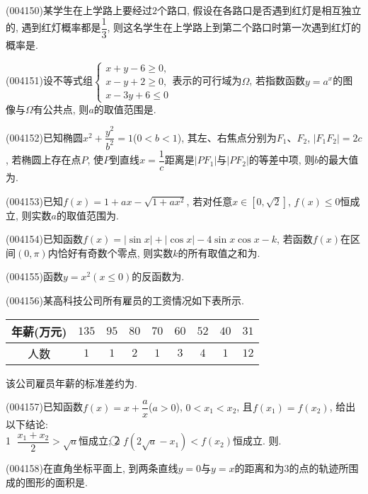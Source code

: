 \item (004150)某学生在上学路上要经过$2$个路口, 假设在各路口是否遇到红灯是相互独立的, 遇到红灯概率都是$\dfrac 13$, 则这名学生在上学路上到第二个路口时第一次遇到红灯的概率是.
\item (004151)设不等式组$\begin{cases} x+y-6\ge 0, \\ x-y+2\ge 0, \\ x-3y+6\le 0 \end{cases}$表示的可行域为$\Omega$, 若指数函数$y=a^x$的图像与$\Omega$有公共点, 则$a$的取值范围是.
\item (004152)已知椭圆$x^2+\dfrac{y^2}{b^2}=1$($0<b<1$), 其左、右焦点分别为$F_1$、$F_2$, $|F_1F_2|=2c$, 若椭圆上存在点$P$, 使$P$到直线$x=\dfrac 1c$距离是$|PF_1|$与$|PF_2|$的等差中项, 则$b$的最大值为.
\item (004153)已知$f(x)=1+ax-\sqrt{1+ax^2}$, 若对任意$x\in [0,\sqrt 2]$, $f(x)\le 0$恒成立, 则实数$a$的取值范围为.
\item (004154)已知函数$f(x)=|\sin x|+|\cos x|-4\sin x\cos x-k$, 若函数$f(x)$在区间$(0,\pi)$内恰好有奇数个零点, 则实数$k$的所有取值之和为.
\item (004155)函数$y=x^2(x\le 0)$的反函数为.
\item (004156)某高科技公司所有雇员的工资情况如下表所示.
\begin{center}
    \begin{tabular}{|c|c|c|c|c|c|c|c|c|}
        \hline
        年薪(万元) & $135$&$95$&$80$&$70$&$60$&$52$&$40$&$31$\\ \hline
        人数& $1$&$1$&$2$&$1$&$3$&$4$&$1$&$12$\\ \hline
    \end{tabular}
\end{center}
该公司雇员年薪的标准差约为.
\item (004157)已知函数$f(x)=x+\dfrac ax$($a>0$), $0<x_1<x_2$, 且$f(x_1)=f(x_2)$, 给出以下结论:\\
\textcircled{1} $\dfrac{x_1+x_2}2>\sqrt a$恒成立; \textcircled{2} $f(2\sqrt a-x_1)<f(x_2)$恒成立. 则.
\item (004158)在直角坐标平面上, 到两条直线$y=0$与$y=x$的距离和为$3$的点的轨迹所围成的图形的面积是.
